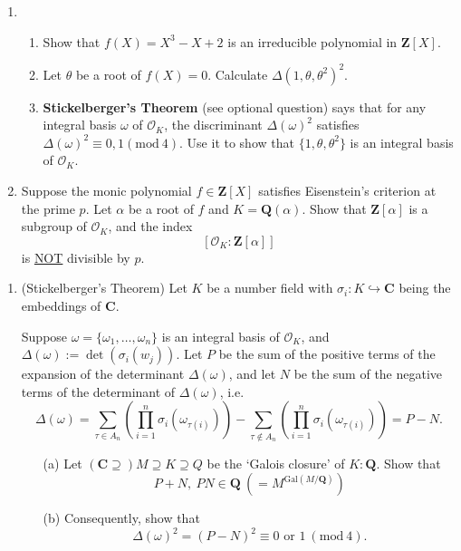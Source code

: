 \documentclass{article}
\begin{document}
\begin{enumerate}
    \item
    \begin{enumerate}
        \item Show that $f(X) = X^3 - X + 2$ is an irreducible polynomial in $\mathbf{Z}[X]$.
        \item Let $\theta$ be a root of $f(X) = 0$. Calculate $\Delta(1, \theta, \theta^2)^2$.
        \item {\bf Stickelberger's Theorem} (see optional question) says that for any integral basis $\omega$ of $\mathcal{O}_K$, the discriminant $\Delta(\omega)^2$ satisfies $\Delta(\omega)^2 \equiv 0, 1 (\text{mod}\ 4)$. Use it to show that $\{1, \theta, \theta^2\}$ is an integral basis of $\mathcal{O}_K$.
    \end{enumerate}

    \item Suppose the monic polynomial $f \in \mathbf{Z}[X]$ satisfies Eisenstein's criterion at the prime $p$. Let $\alpha$ be a root of $f$ and $K = \mathbf{Q}(\alpha)$. Show that $\mathbf{Z}[\alpha]$ is a subgroup of $\mathcal{O}_K$, and the index
    \[
    [\mathcal{O}_K : \mathbf{Z}[\alpha]]
    \]
    is \underline{NOT} divisible by $p$.
\end{enumerate}

\begin{enumerate}
    \item (Stickelberger's Theorem) Let \( K \) be a number field with \( \sigma_i:  K \hookrightarrow \mathbf{C} \) being the embeddings of $\mathbf{C}$. 
    
    Suppose \( \omega = \{ \omega_1, \ldots, \omega_n \} \) is an integral basis of \( \mathcal{O}_K \), and \( \Delta(\omega) := \det(\sigma_i(w_j)) \). Let \( P \) be the sum of the positive terms of the expansion of the determinant \( \Delta(\omega) \), and let \( N \) be the sum of the negative terms of the determinant of \( \Delta(\omega) \), i.e. 
    $$\Delta(\omega) = \sum_{\tau \in A_n} \left(\prod_{i=1}^n \sigma_i(\omega_{\tau(i)})\right) - \sum_{\tau \notin A_n} \left(\prod_{i=1}^n \sigma_i(\omega_{\tau(i)})\right) = P - N.$$

\begin{itemize}
    \item[(a)] Let \( (\mathbf{C} \supseteq) M \supseteq K \supseteq Q \) be the `Galois closure' of $K:\mathbf{Q}$. Show that
    $$P+N,\ PN \in \mathbf{Q}\ (= M^{\mathrm{Gal}(M/\mathbf{Q})})$$
    \item[(b)] Consequently, show that
    $$\Delta(\omega)^2 = (P-N)^2 \equiv 0 \text{ or } 1\ (\mathrm{mod}\ 4).$$
\end{itemize} 



\end{enumerate}
\end{document}
